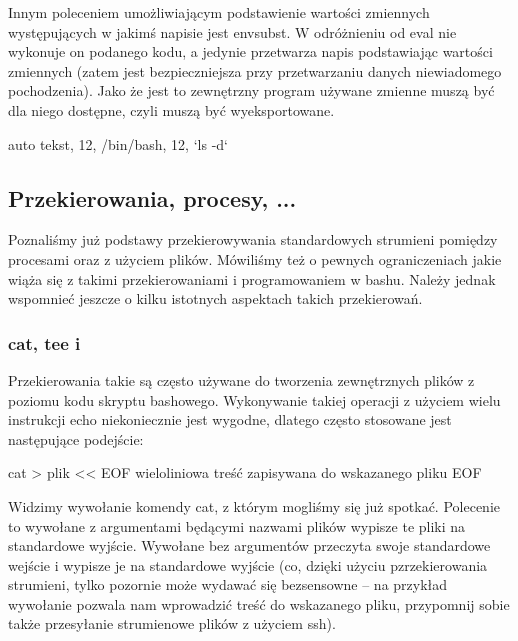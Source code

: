Innym poleceniem umożliwiającym podstawienie wartości zmiennych występujących w jakimś napisie jest envsubst.
W odróżnieniu od eval nie wykonuje on podanego kodu, a jedynie przetwarza napis podstawiając wartości zmiennych
(zatem jest bezpieczniejsza przy przetwarzaniu danych niewiadomego pochodzenia).
Jako że jest to zewnętrzny program używane zmienne muszą być dla niego dostępne, czyli muszą być wyeksportowane.

\begin{CodeFrame}{auto}
tekst, 12, /bin/bash, 12, `ls -d`
\end{CodeFrame}


\subsection{Przekierowania, procesy, ...}

Poznaliśmy już podstawy przekierowywania standardowych strumieni pomiędzy procesami oraz z użyciem plików.
Mówiliśmy też o pewnych ograniczeniach jakie wiąża się z takimi przekierowaniami i programowaniem w bashu.
Należy jednak wspomnieć jeszcze o kilku istotnych aspektach takich przekierowań.

\subsubsection{cat, tee i \shell{<<}}

Przekierowania takie są często używane do tworzenia zewnętrznych plików z poziomu kodu skryptu bashowego.
Wykonywanie takiej operacji z użyciem wielu instrukcji echo niekoniecznie jest wygodne, dlatego często stosowane jest następujące podejście:

\begin{CodeFrame*}[bash]{}
cat > plik << EOF
wieloliniowa
treść zapisywana
do wskazanego pliku
EOF
\end{CodeFrame*}

Widzimy wywołanie komendy cat, z którym mogliśmy się już spotkać.
Polecenie to wywołane z argumentami będącymi nazwami plików wypisze te pliki na standardowe wyjście.
Wywołane bez argumentów przeczyta swoje standardowe wejście i wypisze je na standardowe wyjście
	(co, dzięki użyciu pzrzekierowania strumieni, tylko pozornie może wydawać się bezsensowne – na przykład wywołanie  pozwala nam wprowadzić treść do wskazanego pliku, przypomnij sobie także przesyłanie strumienowe plików z użyciem ssh).

